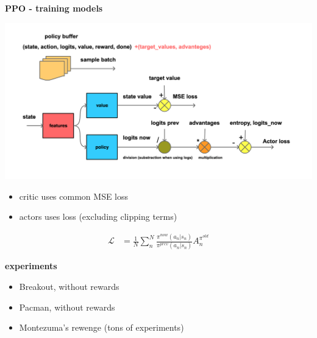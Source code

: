 \documentclass[xcolor=dvipsnames]{beamer}
\begin{document}
\begin{frame}{\bf PPO - training models}

  \centering
  \includegraphics[scale=0.12]{../diagrams/basic/ppotrain.png}

  \begin{itemize}
    \item critic uses common MSE loss
    \item actors uses loss (excluding clipping terms)
  \end{itemize}

  \begin{align*}
  \mathcal{L} &= \frac{1}{N} \sum_{n}^{N} \frac{\pi^{now}(a_n | s_n)} {\pi^{prev}(a_n | s_n)} A_n^{{\pi}^{old}}
  \end{align*} 

\end{frame}


\begin{frame}{\bf experiments}

  \begin{itemize}
    \item Breakout, without rewards
    \item Pacman, without rewards
    \item Montezuma's rewenge (tons of experiments)
  \end{itemize}

\end{frame}
\end{document}
